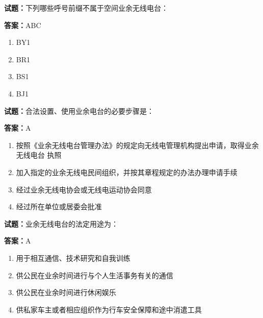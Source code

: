 \documentclass{ctexbook}
\begin{document}





\vspace{1em}

\textbf{试题：}下列哪些呼号前缀不属于空间业余无线电台： 

\textbf{答案：}ABC 

\begin{enumerate}[leftmargin=3em]
  \item BY1 

  \item BR1 

  \item BS1 

  \item BJ1 

\end{enumerate}





\vspace{1em}

\textbf{试题：}合法设置、使用业余电台的必要步骤是： 

\textbf{答案：}A 

\begin{enumerate}[leftmargin=3em]
  \item 按照《业余无线电台管理办法》的规定向无线电管理机构提出申请，取得业余无线电台
执照 

  \item 加入指定的业余无线电民间组织，并按其章程规定的办法办理申请手续 

  \item 经过业余无线电协会或无线电运动协会同意 

  \item 经过所在单位或居委会批准 

\end{enumerate}





\vspace{1em}

\textbf{试题：}业余无线电台的法定用途为： 

\textbf{答案：}A 

\begin{enumerate}[leftmargin=3em]
  \item 用于相互通信、技术研究和自我训练 

  \item 供公民在业余时间进行与个人生活事务有关的通信 

  \item 供公民在业余时间进行休闲娱乐 

  \item 供私家车主或者相应组织作为行车安全保障和途中消遣工具 

\end{enumerate}
\end{document}
